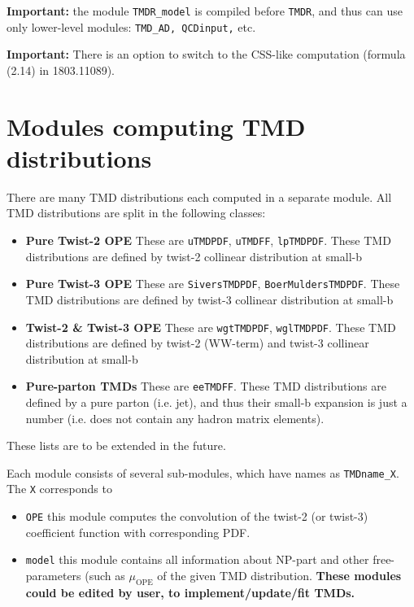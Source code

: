 \documentclass[prd,nofootinbib,eqsecnum,final]{revtex4}
\renewcommand{\(}{\left(}
\renewcommand{\)}{\right)}
\renewcommand{\[}{\left[}
\renewcommand{\]}{\right]}
\newcommand{\blue}[1]{{\color{blue} #1}}
\begin{document}
\vspace{2mm}

\textbf{Important:} the module \texttt{TMDR\_model} is compiled before \texttt{TMDR}, and thus can use only lower-level modules: \texttt{TMD\_AD, QCDinput,} etc.

\vspace{2mm}

\textbf{Important:} There is an option to switch to the CSS-like computation (formula (2.14) in 1803.11089).

\newpage

\section{Modules computing TMD distributions}

There are many TMD distributions each computed in a separate module. All TMD distributions are split in the following classes:
\begin{itemize}
\item \textbf{Pure Twist-2 OPE} These are \texttt{uTMDPDF}, \texttt{uTMDFF}, \texttt{lpTMDPDF}. These TMD distributions are defined by twist-2 collinear distribution at small-b
\item \textbf{Pure Twist-3 OPE} These are \texttt{SiversTMDPDF}, \texttt{BoerMuldersTMDPDF}. These TMD distributions are defined by twist-3 collinear distribution at small-b
\item \textbf{Twist-2 \& Twist-3 OPE} These are \texttt{wgtTMDPDF}, \texttt{wglTMDPDF}. These TMD distributions are defined by twist-2 (WW-term) and twist-3 collinear distribution at small-b
\item \textbf{Pure-parton TMDs} These are \texttt{eeTMDFF}. These TMD distributions are defined by a pure parton (i.e. jet), and thus their small-b expansion is just a number (i.e. does not contain any hadron matrix elements).
\end{itemize}
These lists are to be extended in the future. 

Each module consists of several sub-modules, which have names as \texttt{TMDname\_X}. The \texttt{X} corresponds to
\begin{itemize}
\item  \texttt{OPE} this module computes the convolution of the twist-2 (or twist-3) coefficient function with corresponding PDF.
\item \texttt{model} this module contains all information about NP-part and other free-parameters (such as $\mu_{\text{OPE}}$ of the given TMD distribution. \textbf{\blue{These modules could be edited by user, to implement/update/fit TMDs.}}
\end{itemize}
\end{document}
